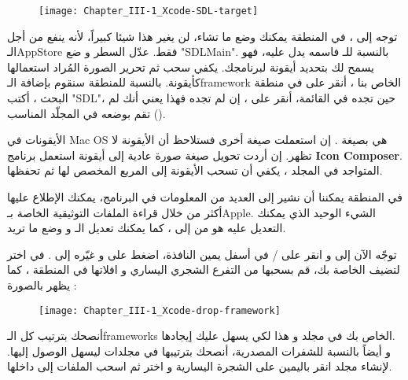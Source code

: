 \begin{figure}[H]
	\centering
	\texttt{[image: Chapter\_III-1\_Xcode-SDL-target]}
\end{figure}

توجه إلى 
،
في المنطقة
يمكنك وضع ما تشاء، لن يغير هذا شيئا كبيراً، لأنه ينفع من أجل الـ\textenglish{AppStore}
فقط. عدّل السطر 
و ضع 
"\textenglish{SDLMain}".
بالنسبة للـ
فاسمه يدل عليه، فهو يسمح لك بتحديد أيقونة لبرنامجك. يكفي سحب ثم تحرير الصورة المُراد استعمالها كأيقونة. بالنسبة للمنطقة 
سنقوم بإضافة الـ\textenglish{framework}
الخاص بنا
،
أنقر على
\InlineCode{+}
في منطقة البحث ، أكتب 
"\textenglish{SDL}"،
حين تجده في القائمة، أنقر على 
،
إن لم تجده فهذا يعني أنك لم تقم بوضعه في المجلّد المناسب 
().

\begin{information}
الأيقونات في
\textenglish{Mac OS}
هي بصيغة
.
إن استعملت صيغة أخرى فستلاحظ أن الأيقونة لا تظهر. إن أردت تحويل صيغة صورة عادية إلى أيقونة استعمل برنامج 
\textbf{\textenglish{Icon Composer}}.
المتواجد في المجلد
،
يكفي أن تسحب الأيقونة إلى المربع المخصص لها ثم تحفظها.
\end{information}

في المنطقة 
يمكننا أن نشير إلى العديد من المعلومات في البرنامج، يمكنك الإطلاع عليها أكثر من خلال قراءة الملفات التوثيقية الخاصة بـ\textenglish{Apple}.
الشيء الوحيد الذي يمكنك التعديل عليه هو 
من 
إلى 
،
كما يمكنك تعديل الـ
و وضع ما تريد.

توجّه الآن إلى 
و انقر على 
 / 
في أسفل يمين النافذة، اضغط على 
و غيّره إلى 
.
في 
اختر
لتضيف الخاصة بك، قم بسحبها من التفرع الشجري اليساري و افلاتها في المنطقة
،
كما يظهر بالصورة  :

\begin{figure}[H]
	\centering
	\texttt{[image: Chapter\_III-1\_Xcode-drop-framework]}
\end{figure}

أنصحك بترتيب كل الـ\textenglish{frameworks}
الخاص بك في مجلد 
و هذا لكي يسهل عليك إيجادها.\\
و أيضاً بالنسبة للشفرات المصدرية، أنصحك بترتيبها في مجلدات ليسهل الوصول إليها. لإنشاء مجلد انقر باليمين على الشجرة اليسارية و اختر
ثم اسحب الملفات إلى داخلها.

